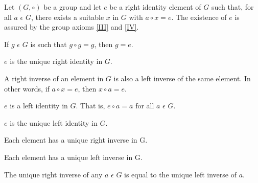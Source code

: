 \documentclass[11pt]{amsbook}
\begin{document}

\begin{lem}
Let $(G, \circ)$ be a group and let $e$ be a right identity element of $G$ such that, for all $a$ $\epsilon$ $G$, there exists a suitable $x$ in $G$ with $a \circ x = e$. The existence of $e$ is assured by the group axioms \ref{III} and \ref{IV}.
\end{lem}

\begin{ax}
If $g$ $\epsilon$ $G$ is such that $g \circ g = g$, then $g = e$.
\end{ax}

\begin{ax}
$e$ is the unique right identity in $G$.
\end{ax}

\begin{ax}
\label{III}
A right inverse of an element in $G$ is also a left inverse of the same element. In other words, if $a \circ x = e$, then $x \circ a = e$.
\end{ax}

\begin{ax}
\label{IV}
$e$ is a left identity in $G$. That is, $e \circ a = a$ for all $a$ $\epsilon$ $G$.
\end{ax}

\begin{ax}
$e$ is the unique left identity in $G$.
\end{ax}

\begin{ax}
Each element has a unique right inverse in G.
\end{ax}

\begin{ax}
Each element has a unique left inverse in G.
\end{ax}

\begin{ax}
The unique right inverse of any $a$ $\epsilon$ $G$ is equal to the unique left inverse of $a$.
\end{ax}
\end{document}
